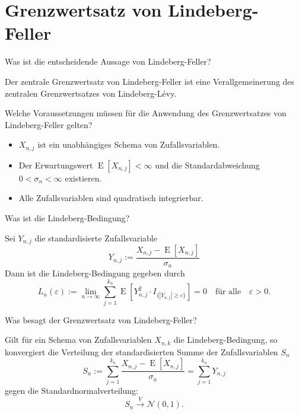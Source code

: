 \newpage
\section*{Grenzwertsatz von Lindeberg-Feller}

\begin{QandA}
    \item Was ist die entscheidende Aussage von Lindeberg-Feller?
    \begin{answered}
        Der zentrale Grenzwertsatz von Lindeberg-Feller ist eine Verallgemeinerung des zentralen Grenzwertsatzes von Lindeberg-Lévy.
    \end{answered}

    \item Welche Voraussetzungen müssen für die Anwendung des Grenzwertsatzes von Lindeberg-Feller gelten?
    \begin{answered}
        \begin{itemize}
            \item $X_{n,j}$ ist ein unabhängiges Schema von Zufallsvariablen.
            \item Der Erwartungswert $\operatorname{E}[X_{n,j}] < \infty$ und die Standardabweichung $0 < \sigma_n < \infty$ existieren.
            \item Alle Zufallsvariablen sind quadratisch integrierbar.
        \end{itemize}
    \end{answered}

    \item Was ist die Lindeberg-Bedingung?
    \begin{answered}
        Sei $Y_{n,j}$ die standardisierte Zufallsvariable
        \[
            Y_{n,j} := \frac{X_{n,j} - \operatorname{E}[X_{n,j}]}{\sigma_n}
        \]
        Dann ist die Lindeberg-Bedingung gegeben durch
        \[
            L_n (\varepsilon) := \lim_{n \to \infty}\sum_{j = 1}^{k_n} \operatorname{E}[Y_{n,j}^2 \cdot I_{\{|Y_{n,j}| \geq \varepsilon\}}] = 0 \quad \text{für alle} \quad \varepsilon > 0.
        \]
    \end{answered}

    \item Was besagt der Grenzwertsatz von Lindeberg-Feller?
    \begin{answered}
        Gilt für ein Schema von Zufallsvariablen $X_{n,k}$ die Lindeberg-Bedingung, so konvergiert die Verteilung der standardisierten Summe der Zufallsvariablen $S_n$
        \[
            S_n := \sum_{j=1}^{k_n} \frac{X_{n,j} - \operatorname{E}[X_{n,j}]}{\sigma_n} = \sum_{j=1}^{k_n} Y_{n,j}
        \]
        gegen die Standardnormalverteilung:
        \[
            S_{n} \xrightarrow{V} \mathcal{N}(0, 1).
        \]
    \end{answered}


\end{QandA}
